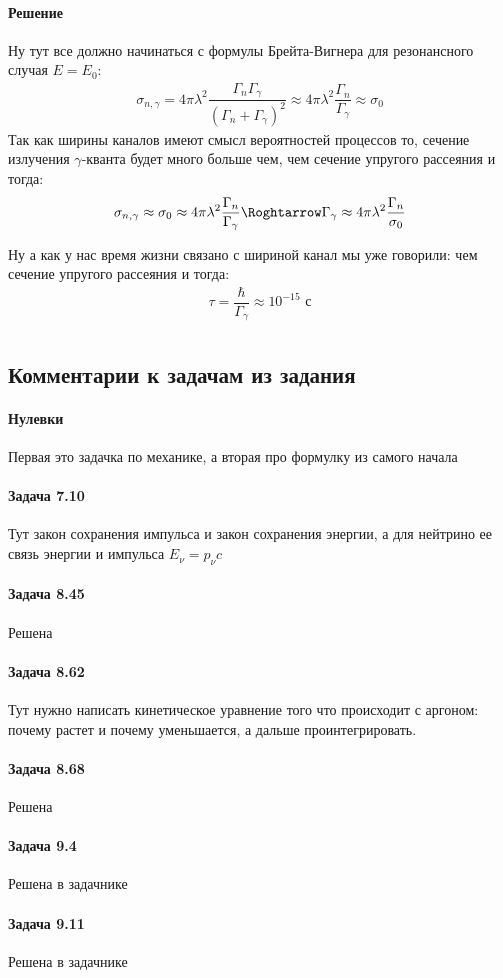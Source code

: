 \documentclass[12pt]{article}
\begin{document}
\paragraph{Решение}
Ну тут все должно начинаться с формулы Брейта-Вигнера для резонансного случая $E = E_0$:
\begin{gather*}
    \sigma_{n, \gamma} = 4\pi \lambda^2 \dfrac{\Gamma_n \Gamma_{\gamma}}{(\Gamma_n +\Gamma_{\gamma})^2} \approx 4\pi \lambda^2 \dfrac{\Gamma_n}{\Gamma_{\gamma}} \approx \sigma_0
\end{gather*}
Так как ширины каналов имеют смысл вероятностей процессов то, сечение излучения $\gamma$-кванта будет много больше чем, чем сечение упругого рассеяния и тогда:
\begin{gather*}
    \sigma_{n, \gamma}  \approx \sigma_0 \approx 4\pi \lambda^2 \dfrac{\Gamma_n}{\Gamma_{\gamma}} \Roghtarrow \Gamma_{\gamma} \approx  4\pi \lambda^2 \dfrac{\Gamma_n}{\sigma_0}\\
\end{gather*}

Ну а как у нас время жизни связано с шириной канал мы уже говорили:
чем сечение упругого рассеяния и тогда:
\begin{gather*}
    \tau = \dfrac{\hbar}{\Gamma_{\gamma}} \approx 10^{-15} \text{ с}\\
\end{gather*}




\subsection{Комментарии к задачам из задания}
\paragraph{Нулевки} Первая это задачка по механике, а вторая про формулку из самого начала
\paragraph{Задача 7.10} Тут закон сохранения импульса и закон сохранения энергии, а для нейтрино ее связь энергии и импульса $E_{\nu} = p_{\nu}c$
\paragraph{Задача 8.45} Решена
\paragraph{Задача 8.62} Тут нужно написать кинетическое уравнение того что происходит с аргоном: почему растет и почему уменьшается, а дальше проинтегрировать. 
\paragraph{Задача 8.68} Решена
\paragraph{Задача 9.4} Решена в задачнике
\paragraph{Задача 9.11} Решена в задачнике
\end{document}
